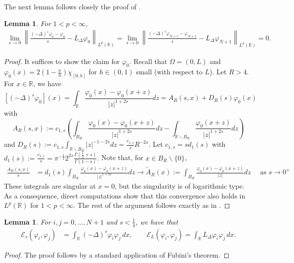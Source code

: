 \documentclass[11 pt]{article}
\newtheorem{lemma}[theorem]{Lemma}
\numberwithin{equation}{section}
\def\tilde{\widetilde}
\def\R{\mathbb{R}}
\def\cE{\mathcal{E}}
\begin{document}
The next lemma follows closely the proof of \cite[Theorem 1.1]{CW19}.
\begin{lemma}\label{phi0:conv}
For $1<p<\infty$,
\begin{align*}
\lim_{s\to 0}\left\|\frac{(-\Delta)^s \varphi_0-\varphi_0}{s}-L_\Delta \varphi_0    \right\|_{L^p(\R)}
=\lim_{s\to 0}\left\|\frac{(-\Delta)^s \varphi_{N+1}-\varphi_{N+1}}{s}-L_\Delta \varphi_{N+1}    \right\|_{L^p(\R)}
=0.
\end{align*}
\end{lemma}
\begin{proof}
It suffices to show the claim for $\varphi_0$. Recall that $\Omega=(0,L)$ and $\varphi_0(x)=2(1-\frac{x}{h})\chi_{[0,h]}$ for $h\in(0,1)$ small (with respect to $L$).  Let $R>4.$  For $x \in \mathbb{R}$, we have
$$
\left[(-\Delta)^s \varphi_0\right](x)=\int_{\mathbb{R}} \frac{\varphi_0(x)-\varphi_0(x+z)}{|z|^{1+2s}} d z=A_R(s, x)+D_R(s) \varphi_0(x)
$$
with
$$
A_R(s, x):=c_{1, s}\left(\int_{B_R} \frac{\varphi_0(x)-\varphi_0(x+z)}{|z|^{1+2 s}} d z-\int_{\mathbb{R} \backslash B_R} \frac{\varphi_0(x+z)}{|z|^{1+2s}} d z\right)
$$
and $D_R(s):=c_{1, s} \int_{\mathbb{R} \backslash B_R}|z|^{-1-2 s} d z=\frac{c_{1, s}}{s}R^{-2 s}.$ Let $c_{1, s}=s d_1(s)$ with $d_1(s):=\frac{c_{1, s}}{s}=\pi^{-\frac{1}{2}} 2^{2 s} \frac{\Gamma\left(\frac{1}{2}+s\right)}{\Gamma(1-s)}.$  Note that, for $x\in B_R\backslash \{0\}$,
\begin{align*}
\frac{A_R(s, x)}{s} & =d_1(s) \int_{B_R} \frac{\varphi_0(x)-\varphi_0(x+z)}{|z|^{1+2 s}} d z
\rightarrow \tilde{A}_R(x):=\int_{B_R} \frac{\varphi_0(x)-\varphi_0(x+z)}{|z|} d z \quad \text { as } s \rightarrow 0^{+}
\end{align*}
These integrals are singular at $x=0$, but the singularity is of logarithmic type.  As a consequence, direct computations show that this convergence also holds in $L^p(\R)$ for $1<p<\infty$.  The rest of the argument follows exactly as in \cite[Theorem 1.1]{CW19}.
\end{proof}

\begin{lemma}\label{ibyp:lem}
For $i,j=0,\ldots,N+1$ and $s<\frac{1}{4}$, we have that
\begin{align*}
    \cE_s(\varphi_i,\varphi_j)&=\int_{\R}(-\Delta)^s\varphi_i\varphi_j\, dx,\qquad \cE_L(\varphi_i,\varphi_j)=\int_{\R}L_\Delta\varphi_i\varphi_j\, dx.
\end{align*}
\end{lemma}
\begin{proof}The proof follows by a standard application of Fubini's theorem. 
\end{proof}
\end{document}
